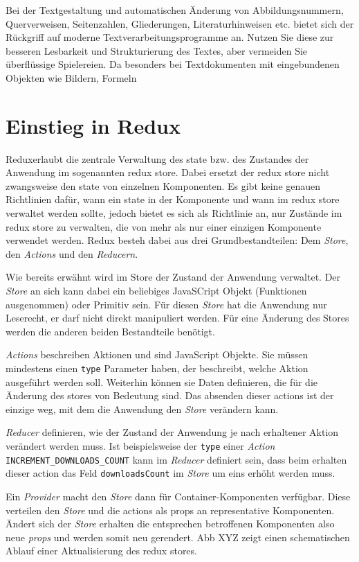 Bei der Textgestaltung und automatischen Änderung von Abbildungsnummern, Querverweisen,
Seitenzahlen, Gliederungen, Literaturhinweisen etc. bietet sich der Rückgriff
auf moderne Textverarbeitungsprogramme an. Nutzen Sie diese zur besseren Lesbarkeit
und Strukturierung des Textes, aber vermeiden Sie überflüssige Spielereien. Da
besonders bei Textdokumenten mit eingebundenen Objekten wie Bildern, Formeln


\section{Einstieg in Redux}
Redux\footnotemark  erlaubt die zentrale Verwaltung des state bzw. des Zustandes der Anwendung im sogenannten redux store. Dabei ersetzt der redux store nicht zwangsweise den state von einzelnen Komponenten. Es gibt keine genauen Richtlinien dafür, wann ein state in der Komponente und wann im redux store verwaltet werden sollte, jedoch bietet es sich als Richtlinie an, nur Zustände im redux store zu verwalten, die von mehr als nur einer einzigen Komponente verwendet werden.
Redux besteh dabei aus drei Grundbestandteilen: Dem \textit{Store}, den \textit{Actions} und den \textit{Reducern}.


Wie bereits erwähnt wird im Store der Zustand der Anwendung verwaltet. Der \textit{Store} an sich kann dabei ein beliebiges JavaSCript Objekt (Funktionen ausgenommen) oder Primitiv sein. Für diesen \textit{Store} hat die Anwendung nur Leserecht, er darf nicht direkt manipuliert werden. Für eine Änderung des Stores werden die anderen beiden Bestandteile benötigt.

\textit{Actions} beschreiben Aktionen und sind JavaScript Objekte. Sie müssen mindestens einen \verb|type| Parameter haben, der beschreibt, welche Aktion ausgeführt werden soll. Weiterhin können sie Daten definieren, die für die Änderung des stores von Bedeutung sind. Das absenden dieser actions ist der einzige weg, mit dem die Anwendung den \textit{Store} verändern kann.

\textit{Reducer} definieren, wie der Zustand der Anwendung je nach erhaltener Aktion verändert werden muss. Ist beispielsweise der \verb|type| einer \textit{Action} \verb|INCREMENT_DOWNLOADS_COUNT| kann im \textit{Reducer} definiert sein, dass beim erhalten dieser action das Feld \verb|downloadsCount| im \textit{Store} um eins erhöht werden muss.

Ein \textit{Provider} macht den \textit{Store} dann für Container-Komponenten verfügbar. Diese verteilen den \textit{Store} und die actions als props an representative Komponenten. Ändert sich der \textit{Store} erhalten die entsprechen betroffenen Komponenten also neue \textit{props} und werden somit neu gerendert.
Abb XYZ zeigt einen schematischen Ablauf einer Aktualisierung des redux stores.

